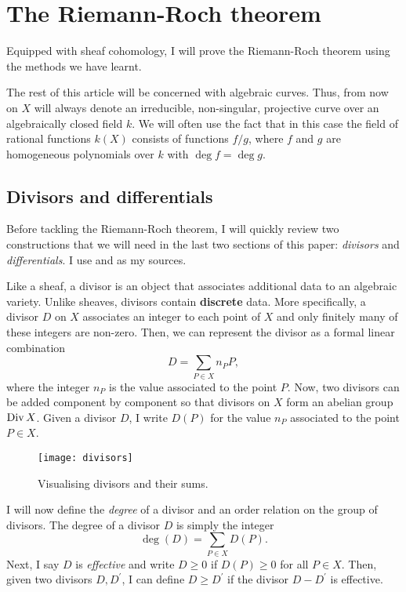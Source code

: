 \section{The Riemann-Roch theorem}
Equipped with sheaf cohomology, I will prove the Riemann-Roch theorem
using the methods we have learnt.
\begin{lnote}
  The rest of this article will be concerned with algebraic curves. Thus,
  from now on $X$ will always denote an irreducible, non-singular,
  projective curve over an algebraically closed field $k$. We will often
  use the fact that in this case the field of rational functions $k(X)$
  consists of functions $f/g$, where $f$ and $g$ are homogeneous
  polynomials over $k$ with $\deg f=\deg g$.
\end{lnote}

\subsection{Divisors and differentials}
Before tackling the Riemann-Roch theorem, I will quickly review two
constructions that we will need in the last two sections of this paper:
\emph{divisors} and \emph{differentials}. I use \cite{gathmann}
and \cite{serre} as my sources.

Like a sheaf, a divisor is an object that associates additional data to
an algebraic variety. Unlike sheaves, divisors contain \textbf{discrete}
data. More specifically, a divisor $D$ on $X$ associates an integer to
each point of $X$ and only finitely many of these integers are non-zero.
Then, we can represent the divisor as a formal linear combination
\[
  D=\sum_{P\in X}n_{P}P,
\]
where the integer $n_{P}$ is the value associated to the point $P$.
Now, two divisors can be added component by component so that divisors on
$X$ form an abelian group $\operatorname{Div} X$. Given a divisor $D$, I write $D(P)$
for the value $n_{P}$ associated to the point $P\in X$.
\begin{figure}[H]
  \centering
  \texttt{[image: divisors]}
  \caption{Visualising divisors and their sums.}
\end{figure}
I will now define the \emph{degree} of a divisor and an order relation on
the group of divisors. The degree of a divisor $D$ is simply the integer
\[
  \deg(D) = \sum_{P\in X} D(P).
\]
Next, I say $D$ is \emph{effective} and write $D\geq 0$ if $D(P)\geq 0$
for all $P\in X$. Then, given two divisors $D, D^{\prime}$, I can define
$D\geq D^{\prime}$ if the divisor $D-D^{\prime}$ is effective.

